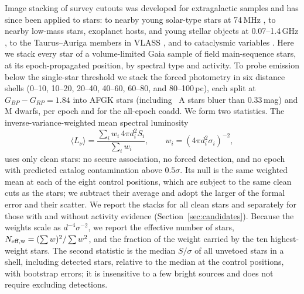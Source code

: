\documentclass[linenumbers]{aastex702}
\newcommand{\Lnu}{L_\nu}
\begin{document}
Image stacking of survey cutouts was developed for extragalactic samples \citep{White2007} and has since been applied to stars: to nearby young solar-type stars at 74\,MHz \citep{Lazio2010}, to nearby low-mass stars, exoplanet hosts, and young stellar objects at 0.07--1.4\,GHz \citep{Ling2022}, to the Taurus--Auriga members in VLASS \citep{Rahman2025}, and to cataclysmic variables \citep{Rao2026}. Here we stack every star of a volume-limited Gaia sample of field main-sequence stars, at its epoch-propagated position, by spectral type and activity. To probe emission below the single-star threshold we stack the forced photometry in six distance shells (0--10, 10--20, 20--40, 40--60, 60--80, and 80--100\,pc), each split at $G_{BP}-G_{RP}=1.84$ into AFGK stars (including \NAstars\ A stars bluer than 0.33\,mag) and M dwarfs, per epoch and for the all-epoch coadd. We form two statistics. The inverse-variance-weighted mean spectral luminosity
\begin{equation}
\langle\Lnu\rangle=\frac{\sum_i w_i\,4\pi d_i^2 S_i}{\sum_i w_i},\qquad w_i=\left(4\pi d_i^2\sigma_i\right)^{-2},
\end{equation}
uses only clean stars: no secure association, no forced detection, and no epoch with predicted catalog contamination above $0.5\sigma$. Its null is the same weighted mean at each of the eight control positions, which are subject to the same clean cuts as the stars; we subtract their average and adopt the larger of the formal error and their scatter. We report the stacks for all clean stars and separately for those with and without activity evidence (Section~\ref{sec:candidates}). Because the weights scale as $d^{-4}\sigma^{-2}$, we report the effective number of stars, $N_{\rm eff,w}=(\sum w)^2/\sum w^2$, and the fraction of the weight carried by the ten highest-weight stars. The second statistic is the median $S/\sigma$ of all unvetoed stars in a shell, including detected stars, relative to the median at the control positions, with bootstrap errors; it is insensitive to a few bright sources and does not require excluding detections.
\end{document}
